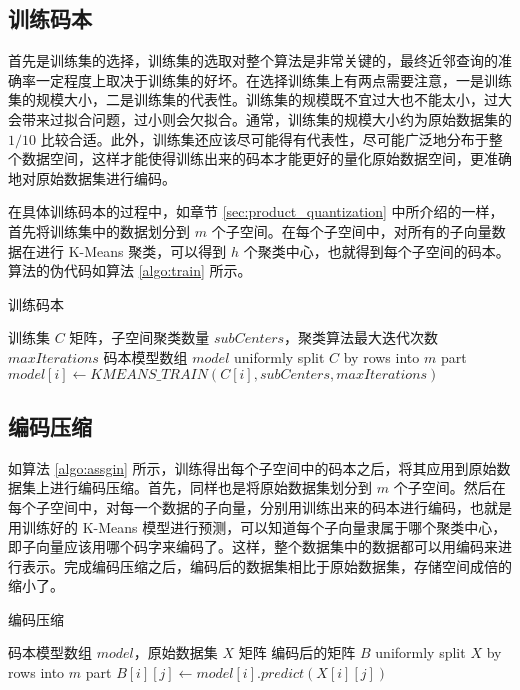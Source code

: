 \subsection{训练码本}
首先是训练集的选择，训练集的选取对整个算法是非常关键的，最终近邻查询的准确率一定程度上取决于训练集的好坏。在选择训练集上有两点需要注意，一是训练集的规模大小，二是训练集的代表性。训练集的规模既不宜过大也不能太小，过大会带来过拟合问题，过小则会欠拟合。通常，训练集的规模大小约为原始数据集的 $1/10$ 比较合适。此外，训练集还应该尽可能得有代表性，尽可能广泛地分布于整个数据空间，这样才能使得训练出来的码本才能更好的量化原始数据空间，更准确地对原始数据集进行编码。

在具体训练码本的过程中，如章节 \ref{sec:product_quantization} 中所介绍的一样，首先将训练集中的数据划分到 $m$ 个子空间。在每个子空间中，对所有的子向量数据在进行 K-Means 聚类，可以得到 $h$ 个聚类中心，也就得到每个子空间的码本。算法的伪代码如算法 \ref{algo:train} 所示。
\begin{algorithm}
    \caption{训练码本}
    \label{algo:train}
    \begin{algorithmic}[1] %
        \Require 训练集 $C$ 矩阵，子空间聚类数量 $subCenters$，聚类算法最大迭代次数 $maxIterations$
        \Ensure 码本模型数组 $model$
            \State uniformly split $C$ by rows into $m$ part
                \State $model[i] \gets KMEANS\_TRAIN(C[i], subCenters, maxIterations)$
            \EndFor
            \State {}
        \EndFunction
    \end{algorithmic}
\end{algorithm}
\subsection{编码压缩}
如算法 \ref{algo:assgin} 所示，训练得出每个子空间中的码本之后，将其应用到原始数据集上进行编码压缩。首先，同样也是将原始数据集划分到 $m$ 个子空间。然后在每个子空间中，对每一个数据的子向量，分别用训练出来的码本进行编码，也就是用训练好的 K-Means 模型进行预测，可以知道每个子向量隶属于哪个聚类中心，即子向量应该用哪个码字来编码了。这样，整个数据集中的数据都可以用编码来进行表示。完成编码压缩之后，编码后的数据集相比于原始数据集，存储空间成倍的缩小了。
\begin{algorithm}
    \caption{编码压缩}
    \label{algo:assgin}
    \begin{algorithmic}[1] %
        \Require 码本模型数组 $model$，原始数据集 $X$ 矩阵
        \Ensure 编码后的矩阵 $B$
            \State uniformly split $X$ by rows into $m$ part
                    \State $B[i][j] \gets model[i].predict(X[i][j])$
                \EndFor
            \EndFor
            \State {}
        \EndFunction
    \end{algorithmic}
\end{algorithm}
